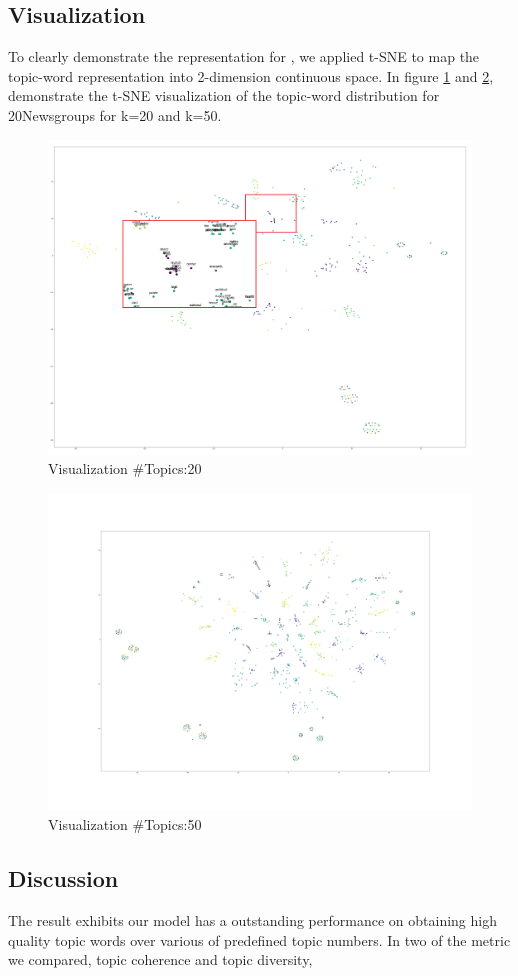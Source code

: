 \subsection{Visualization}
To clearly demonstrate the representation for , we applied t-SNE to map the topic-word representation into 2-dimension continuous space. In figure \ref{fig:tsne20t25w2} and \ref{fig:tsne50t25w0}, demonstrate the t-SNE visualization of the topic-word distribution for 20Newsgroups for k=20 and k=50.
\begin{figure}
\centering
\includegraphics[width=1\linewidth]{figures/0908/tsne_20t_25w_2}
\caption{Visualization \#Topics:20}
\label{fig:tsne20t25w2}
\end{figure}
\begin{figure}
\centering
\includegraphics[width=1\linewidth]{figures/0908/tsne_50t_25w_0}
\caption{Visualization \#Topics:50}
\label{fig:tsne50t25w0}
\end{figure}
\subsection{Discussion}
The result exhibits our model has a outstanding performance on obtaining high quality topic words over various of predefined topic numbers. In two of the metric we compared, topic coherence and topic diversity, 